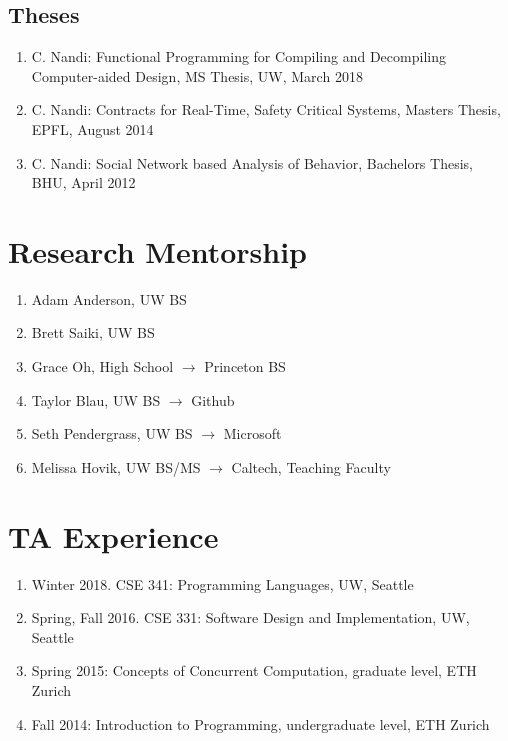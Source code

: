 \documentclass[margin, 10pt]{res} %
\begin{document}
\begin{resume}
\subsection{Theses}
\begin{enumerate}
\item C. Nandi: Functional Programming for Compiling and Decompiling Computer-aided Design, {MS Thesis}, UW, March 2018
\item C. Nandi: Contracts for Real-Time, Safety Critical Systems, {Masters Thesis}, EPFL, August 2014
\item C. Nandi: Social Network based Analysis of Behavior, {Bachelors Thesis}, BHU, April 2012
\end{enumerate}

\section{Research Mentorship}
\begin{enumerate}
  \item Adam Anderson, UW BS
  \item Brett Saiki, UW BS
  \item Grace Oh, High School $\rightarrow$ Princeton BS
  \item Taylor Blau, UW BS $\rightarrow$ Github
  \item Seth Pendergrass, UW BS $\rightarrow$ Microsoft
  \item Melissa Hovik, UW BS/MS $\rightarrow$ Caltech, Teaching Faculty
\end{enumerate}

\section{TA Experience}
\begin{enumerate}
\item Winter 2018. CSE 341: Programming Languages, UW, Seattle
\item Spring, Fall 2016. CSE 331: Software Design and Implementation, UW, Seattle
\item Spring 2015: Concepts of Concurrent Computation, graduate level, ETH Zurich
\item Fall 2014: Introduction to Programming, undergraduate level, ETH Zurich
\end{enumerate}


\end{resume}
\end{document}
